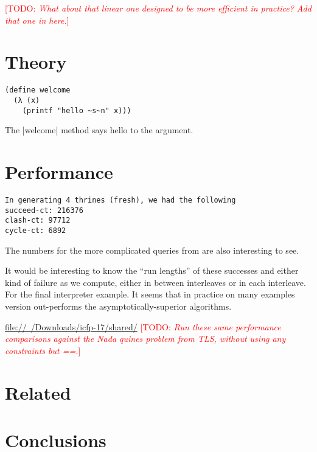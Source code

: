 \documentclass[screen,anonymous,review,natbib=false]{acmart} %
\newcommand{\meta}[2]{[\textsc{#1}: \emph{#2}]}
\newcommand{\todo}[1]{\textcolor{red}{\meta{TODO}{#1}}}
\begin{document}
\todo{What about that linear one designed to be more efficient in
  practice? Add that one in here.}

\section{Theory}\label{sec:theory}

\begin{listing}
\begin{verbatim}  
(define welcome
  (λ (x)
    (printf "hello ~s~n" x)))
\end{verbatim}
\caption{The \rackinline|welcome| method says hello to the argument.}
\label{mnt:welcome}
\end{listing}

\section{Performance}\label{sec:performance}

\begin{verbatim}
In generating 4 thrines (fresh), we had the following
succeed-ct: 216376
clash-ct: 97712
cycle-ct: 6892
\end{verbatim}


The numbers for the more complicated queries from
\citet{byrd2017unifiedapproach} are also interesting to see.

It would be interesting to know the ``run lengths'' of these successes
and either kind of failure as we compute, either in between
interleaves or in each interleave. For the \citet{byrd2017unifiedapproach}
final interpreter example. It seems that in practice on many examples
 version out-performs the
asymptotically-superior algorithms.

\href{file://~/Downloads/icfp-17/shared/}{file://~/Downloads/icfp-17/shared/}
\todo{Run these same performance comparisons against the Nada quines problem from TLS, without using any constraints but ==.}

\section{Related}\label{sec:related}


\section{Conclusions}\label{sec:conclusions}



\printbibliography{}
\end{document}
